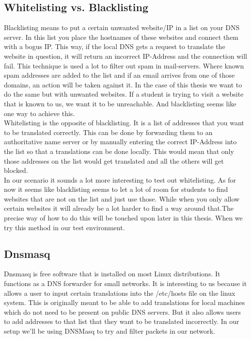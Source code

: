 \subsection{Whitelisting vs. Blacklisting}
Blacklisting means to put a certain unwanted website/IP in a list on your DNS server. In this list you place the hostnames of these websites and connect them with a bogus IP. This way, if the local DNS gets a request to translate the website in question, it will return an incorrect IP-Address and the connection will fail. This technique is used a lot to filter out spam in mail-servers. Where known spam addresses are added to the list and if an email arrives from one of those domains, an action will be taken against it. In the case of this thesis we want to do the same but with unwanted websites. If a student is trying to visit a website that is known to us, we want it to be unreachable. And blacklisting seems like one way to achieve this.\\
Whitelisting is the opposite of blacklisting. It is a list of addresses that you want to be translated correctly. This can be done by forwarding them to an authoritative name server or by manually entering the correct IP-Address into the list so that a translations can be done locally. This would mean that only those addresses on the list would get translated and all the others will get blocked.\\
In our scenario it sounds a lot more interesting to test out whitelisting. As for now it seems like blacklisting seems to let a lot of room for students to find websites that are not on the list and just use those. While when you only allow certain websites it will already be a lot harder to find a way around that.The precise way of how to do this will be touched upon later in this thesis. When we try this method in our test environment.
\subsection{Dnsmasq}
Dnsmasq is free software that is installed on most Linux distributions. It functions as a DNS forwarder for small networks. It is interesting to us because it allows a user to input certain translations into the /etc/hosts file on the linux system. This is originally meant to be able to add translations for local machines which do not need to be present on public DNS servers. But it also allows users to add addresses to that list that they want to be translated incorrectly. In our setup we'll be using DNSMasq to try and filter packets in our network.
